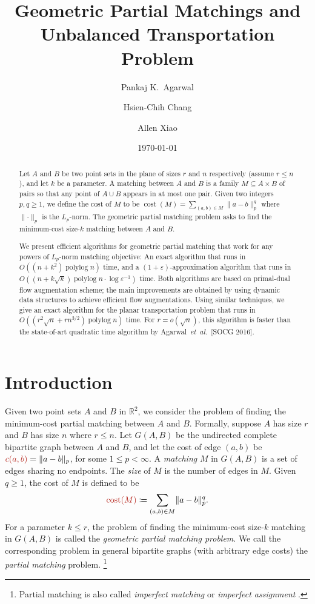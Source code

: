\documentclass[a4paper,UKenglish]{socg-lipics-v2018}
\title{Geometric Partial Matchings and Unbalanced Transportation Problem}
\author{Pankaj K.\ Agarwal}{Duke University, USA}{pankaj@cs.duke.edu}{}{}
\author{Hsien-Chih Chang}{Duke University, USA}{hsienchih.chang@duke.edu}{}{}
\author{Allen Xiao}{Duke University, USA}{axiao@cs.duke.edu}{}{}
\date{\today}
\def\etal{\emph{et~al.}}
\def\etal{\textit{et~al.}}
\def\polylog{\mathop{\mathrm{polylog}}}
\def\eps{\varepsilon}
\def\reals{\mathbb{R}}
\def\norm#1{\mathopen\| #1 \mathclose\|}	%
\def\cost{\operatorname{cost}}
\theoremstyle{plain}
\numberwithin{figure}{section}
\def\EMPH#1{\textcolor{BrickRed}{{\emph{#1}}}}
\begin{document}
\maketitle

\begin{abstract}
Let $A$ and $B$ be two point sets in the plane of sizes $r$ and $n$ respectively (assume $r \leq n$), and let $k$ be a parameter.
A matching between $A$ and $B$ is a family $M \subseteq A \times B$ of pairs so that any point of $A \cup B$ appears in at most one pair.
Given two integers $p, q \geq 1$, we define the cost of $M$ to be $\cost(M) = \sum_{(a, b) \in M}\norm{a-b}_p^q$ where $\norm{\cdot}_p$ is the $L_p$-norm.
The geometric partial matching problem asks to find the minimum-cost size-$k$ matching between $A$ and $B$.

We present efficient algorithms for geometric partial matching that work for any powers of $L_p$-norm matching objective:
An exact algorithm that runs in $O((n + k^2)\polylog n)$ time, and a $(1 + \eps)$-approximation algorithm that runs in $O((n + k\sqrt{k})\polylog n \cdot \log\eps^{-1})$ time.
Both algorithms are based on primal-dual flow augmentation scheme; the main improvements are obtained by using dynamic data structures to achieve efficient flow augmentations.
Using similar techniques, we give an exact algorithm for the planar transportation problem that runs in $O((r^2\sqrt{n} + rn^{3/2})\polylog n)$ time.
For $r = o(\sqrt{n})$, this algorithm is faster than the state-of-art quadratic time algorithm by Agarwal~\etal\ [SOCG 2016].
\end{abstract}


\section{Introduction}

Given two point sets $A$ and $B$ in $\reals^2$, we consider the problem of finding
the minimum-cost partial matching between $A$ and $B$.
Formally, suppose $A$ has size $r$ and $B$ has size $n$ where $r \leq n$.
Let $G(A, B)$ be the undirected complete bipartite graph between
$A$ and $B$, and let the cost of edge $(a, b)$ be
$\EMPH{$c(a, b)$} = \norm{a-b}_p$, for some $1 \leq p < \infty$.
A \EMPH{matching} $M$ in $G(A, B)$ is a set of edges sharing no endpoints.
The \EMPH{size} of $M$ is the number of edges in $M$.
Given $q \geq 1$, the cost of $M$ is defined to be
\begin{equation*}
	\EMPH{$\cost(M)$} \coloneqq \sum_{(a, b) \in M} \norm{a-b}_p^q.
\end{equation*}
For a parameter $k \leq r$, the problem of finding the minimum-cost
size-$k$ matching in $G(A, B)$ is called the \EMPH{geometric partial matching problem}.
We call the corresponding problem in general bipartite graphs (with arbitrary
edge costs) the \EMPH{partial matching} problem.%
\footnote{Partial matching is also called \EMPH{imperfect matching} or \EMPH{imperfect assignment} \cite{RT12,GHKT17}.}
\end{document}
